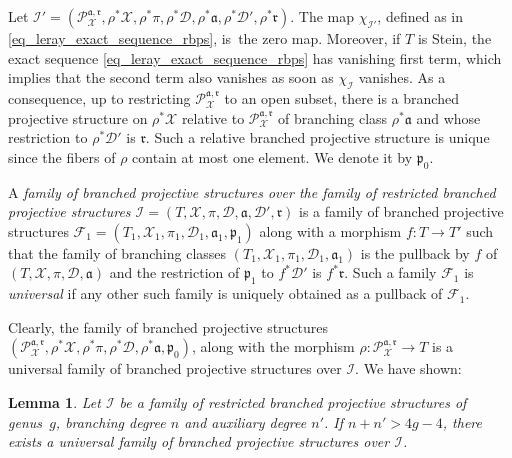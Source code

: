 \documentclass[JEP,XML,SOM,Unicode,NoEqCountersInSection,published]{cedram}
\theoremstyle{definition}
\theoremstyle{plain}
\newtheorem{lemma}[definition]{Lemma}
\begin{document}
Let $\mathcal I' = \left(\mathcal P_{\mathcal X}^{\mathfrak a, \mathfrak r}, \rho^* \mathcal X, \rho^* \pi, \rho^* \mathcal D, \rho^* \mathfrak a, \rho^* \mathcal D', \rho^* \mathfrak r\right)$.
The map $\chi_{\mathcal I'}$, defined as in \eqref{eq_leray_exact_sequence_rbps}, is~the zero map.
Moreover, if $T$ is Stein, the exact sequence \eqref{eq_leray_exact_sequence_rbps} has vanishing first term, which implies that the second term also vanishes as soon as $\chi_{\mathcal I}$ vanishes.
As a consequence, up to restricting $\mathcal P_{\mathcal X}^{\mathfrak a, \mathfrak r}$ to an open subset, there is a branched projective structure on $\rho^* \mathcal X$ relative to $\mathcal P_{\mathcal X}^{\mathfrak a, \mathfrak r}$ of branching class $\rho^* \mathfrak a$ and whose restriction to $\rho^*\mathcal D'$ is $\mathfrak r$.
Such a relative branched projective structure is unique since the fibers of $\rho$ contain at most one element.
We denote it by $\mathfrak p_0$.

A \emph{family of branched projective structures over the family of restricted branched projective structures $\mathcal I = (T, \mathcal X, \pi, \mathcal D, \mathfrak a, \mathcal D', \mathfrak r)$} is a family of branched projective structures $\mathcal F_1 = (T_1, \mathcal X_1, \pi_1, \mathcal D_1, \mathfrak a_1, \mathfrak p_1)$ along with a morphism $f: T \to T'$ such that the family of branching classes $(T_1, \mathcal X_1, \pi_1, \mathcal D_1, \mathfrak a_1)$ is the pullback by $f$ of $(T, \mathcal X, \pi, \mathcal D, \mathfrak a)$ and the restriction of $\mathfrak p_1$ to $f^*\mathcal D'$ is $f^* \mathfrak r$.
Such a family $\mathcal F_1$ is \emph{universal} if any other such family is uniquely obtained as a pullback of $\mathcal F_1$.

Clearly, the family of branched projective structures $\left(\mathcal P_{\mathcal X}^{\mathfrak a, \mathfrak r}, \rho^* \mathcal X, \rho^* \pi, \rho^* \mathcal D, \rho^* \mathfrak a, \mathfrak p_0\right)$, along with the morphism $\rho: \mathcal P_{\mathcal X}^{\mathfrak a, \mathfrak r} \to T$ is a universal family of branched projective structures over $\mathcal I$.
We have shown:

\begin{lemma}
Let $\mathcal I$ be a family of restricted branched projective structures of genus~$g$, branching degree $n$ and auxiliary degree $n'$. If $n+n' > 4g-4$, there exists a universal family of branched projective structures over $\mathcal I$.
\end{lemma}
\end{document}
